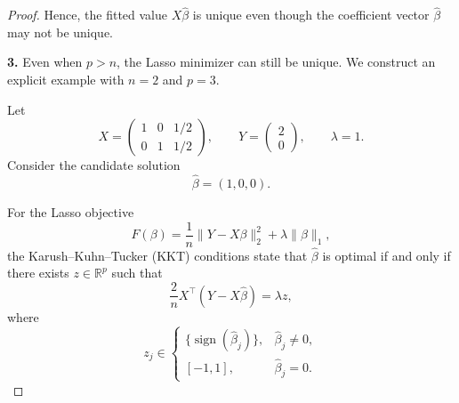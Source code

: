 \documentclass[12pt]{article}
\renewcommand{\(}{\left(}%
\renewcommand{\)}{\right)}%
\renewcommand{\[}{\left[}%
\renewcommand{\]}{\right]}%
\newtheorem{proof}{Proof.}}
\begin{document}
\begin{proof}
Hence, the fitted value $X\hat\beta$ is unique even though the coefficient vector $\hat\beta$ may not be unique.

\medskip
\noindent
\textbf{3.}
Even when $p>n$, the Lasso minimizer can still be unique. 
We construct an explicit example with $n=2$ and $p=3$.

Let
\begin{equation*}
X=
\begin{pmatrix}
1 & 0 & 1/2\\
0 & 1 & 1/2
\end{pmatrix},
\qquad
Y=
\begin{pmatrix}
2\\
0
\end{pmatrix},
\qquad
\lambda=1 .
\end{equation*}
Consider the candidate solution
\begin{equation*}
\hat\beta=(1,0,0).
\end{equation*}

For the Lasso objective
\begin{equation*}
F(\beta)
=
\frac{1}{n}\|Y-X\beta\|_2^2+\lambda\|\beta\|_1,
\end{equation*}
the Karush--Kuhn--Tucker (KKT) conditions state that $\hat\beta$ is optimal 
if and only if there exists $z\in\mathbb{R}^p$ such that
\begin{equation*}
\frac{2}{n}X^\top(Y-X\hat\beta)=\lambda z,
\end{equation*}
where
\begin{equation*}
z_j\in
\begin{cases}
\{\operatorname{sign}(\hat\beta_j)\}, & \hat\beta_j\neq0,\\
[-1,1], & \hat\beta_j=0 .
\end{cases}
\end{equation*}


\end{proof}
\end{document}
